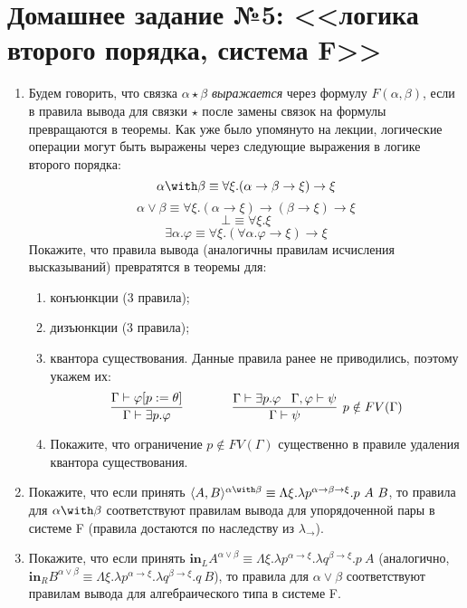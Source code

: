 \documentclass[10pt,a4paper,oneside]{article}
\begin{document}
\section*{Домашнее задание №5: <<логика второго порядка, система F>>}
\begin{enumerate}
\item Будем говорить, что связка $\alpha\star\beta$ \emph{выражается} через формулу $F(\alpha,\beta)$,
если в правила вывода для связки $\star$ после замены связок на формулы превращаются в теоремы.
Как уже было упомянуто на лекции, логические операции могут быть выражены через следующие выражения
в логике второго порядка:
$$\alpha\with\beta \equiv \forall\xi.(\alpha\rightarrow\beta\rightarrow\xi)\rightarrow\xi$$
$$\alpha\vee\beta \equiv \forall\xi.(\alpha\rightarrow\xi)\rightarrow(\beta\rightarrow\xi)\rightarrow\xi$$
$$\bot \equiv \forall\xi.\xi$$
$$\exists \alpha.\varphi \equiv \forall\xi.(\forall\alpha.\varphi\rightarrow\xi)\rightarrow\xi$$
Покажите, что правила вывода (аналогичны правилам исчисления высказываний)
превратятся в теоремы для:
\begin{enumerate}
\item конъюнкции (3 правила);
\item дизъюнкции (3 правила);
\item квантора существования. Данные правила ранее не приводились, поэтому укажем их:
$$\infer{\Gamma\vdash\exists p.\varphi}{\Gamma\vdash\varphi[p := \theta]} \quad\quad\quad\quad
  \infer[p \notin FV(\Gamma)]{\Gamma\vdash\psi}{\Gamma\vdash\exists p.\varphi\;\;\;\Gamma,\varphi\vdash\psi}$$
\item Покажите, что ограничение $p\notin FV(\Gamma)$ существенно в правиле удаления квантора существования.
\end{enumerate}
\item Покажите, что если принять $\langle A,B\rangle^{\alpha\with\beta} \equiv \Lambda\xi.\lambda p^{\alpha\rightarrow\beta\rightarrow\xi}.p\ A\ B$,
то правила для $\alpha\with\beta$ соответствуют правилам вывода для упорядоченной пары в системе F 
(правила достаются по наследству из $\lambda_\rightarrow$).
\item Покажите, что если принять $\textbf{in}_L A^{\alpha\vee\beta} \equiv \Lambda\xi.\lambda p^{\alpha\rightarrow\xi}.\lambda q^{\beta\rightarrow\xi}.p\ A$
(аналогично, $\textbf{in}_R B^{\alpha\vee\beta} \equiv \Lambda\xi.\lambda p^{\alpha\rightarrow\xi}.\lambda q^{\beta\rightarrow\xi}.q\ B$),
то правила для $\alpha\vee\beta$ соответствуют правилам вывода для алгебраического типа в системе F.

\end{enumerate}
\end{document}
